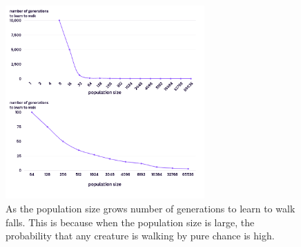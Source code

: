 \begin{figure}[H]
    \includegraphics[width=3in]{numberofgenerationstolearntowalk.png} %
    \caption{As the population size grows number of generations to learn to walk falls. This is because when the population size is large, the probability that any creature is walking by pure chance is high.}
    \label{fig:struktura} %
\end{figure}


